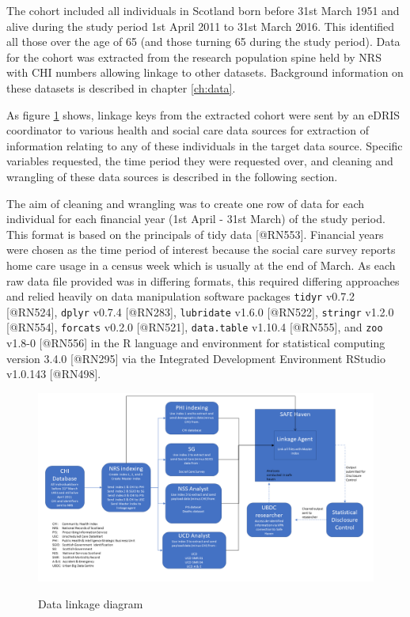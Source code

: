 \documentclass[]{article}
\begin{document}
The cohort included all individuals in Scotland born before 31st March
1951 and alive during the study period 1st April 2011 to 31st March
2016. This identified all those over the age of 65 (and those turning 65
during the study period). Data for the cohort was extracted from the
research population spine held by NRS with CHI numbers allowing linkage
to other datasets. Background information on these datasets is described
in chapter \ref{ch:data}.

As figure \ref{fig:methods-linkage} shows, linkage keys from the
extracted cohort were sent by an eDRIS coordinator to various health and
social care data sources for extraction of information relating to any
of these individuals in the target data source. Specific variables
requested, the time period they were requested over, and cleaning and
wrangling of these data sources is described in the following section.

The aim of cleaning and wrangling was to create one row of data for each
individual for each financial year (1st April - 31st March) of the study
period. This format is based on the principals of tidy data
{[}@RN553{]}. Financial years were chosen as the time period of interest
because the social care survey reports home care usage in a census week
which is usually at the end of March. As each raw data file provided was
in differing formats, this required differing approaches and relied
heavily on data manipulation software packages \texttt{tidyr} v0.7.2
{[}@RN524{]}, \texttt{dplyr} v0.7.4 {[}@RN283{]}, \texttt{lubridate}
v1.6.0 {[}@RN522{]}, \texttt{stringr} v1.2.0 {[}@RN554{]},
\texttt{forcats} v0.2.0 {[}@RN521{]}, \texttt{data.table} v1.10.4
{[}@RN555{]}, and \texttt{zoo} v1.8-0 {[}@RN556{]} in the R language and
environment for statistical computing version 3.4.0 {[}@RN295{]} via the
Integrated Development Environment RStudio v1.0.143 {[}@RN498{]}.

\FloatBarrier

\begin{landscape}
\begin{figure}
  \centering
    \caption{Data linkage diagram}
    \includegraphics{figures/chapter-methods/linkage_diagram.png}
    \label{fig:methods-linkage}
\end{figure}
\end{landscape}
\end{document}

